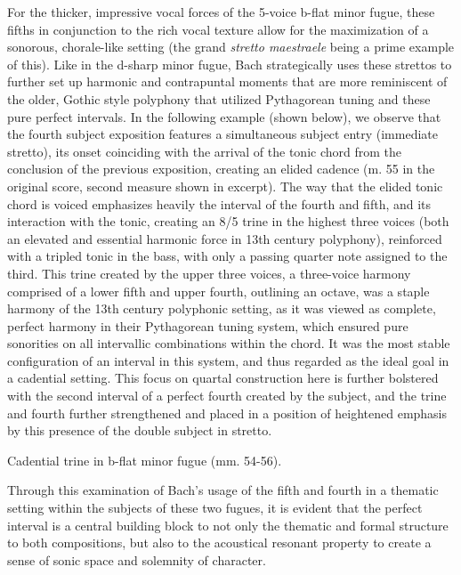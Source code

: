     For the thicker, impressive vocal forces of the 5-voice b-flat minor
fugue, these fifths in conjunction to the rich vocal texture allow for
the maximization of a sonorous, chorale-like setting (the grand
\emph{stretto maestraele} being a prime example of this). Like in the
d-sharp minor fugue, Bach strategically uses these strettos to further
set up harmonic and contrapuntal moments that are more reminiscent of
the older, Gothic style polyphony that utilized Pythagorean tuning and
these pure perfect intervals. In the following example (shown below), we
observe that the fourth subject exposition features a simultaneous
subject entry (immediate stretto), its onset coinciding with the arrival
of the tonic chord from the conclusion of the previous exposition,
creating an elided cadence (m. 55 in the original score, second measure
shown in excerpt). The way that the elided tonic chord is voiced
emphasizes heavily the interval of the fourth and fifth, and its
interaction with the tonic, creating an 8/5 trine in the highest three
voices (both an elevated and essential harmonic force in 13th century
polyphony), reinforced with a tripled tonic in the bass, with only a
passing quarter note assigned to the third. This trine created by the
upper three voices, a three-voice harmony comprised of a lower fifth and
upper fourth, outlining an octave, was a staple harmony of the 13th
century polyphonic setting, as it was viewed as complete, perfect
harmony in their Pythagorean tuning system, which ensured pure
sonorities on all intervallic combinations within the chord. It was the
most stable configuration of an interval in this system, and thus
regarded as the ideal goal in a cadential setting. This focus on quartal
construction here is further bolstered with the second interval of a
perfect fourth created by the subject, and the trine and fourth further
strengthened and placed in a position of heightened emphasis by this
presence of the double subject in stretto.



\begin{Example}[H]
    \begin{center}
    \caption{ Cadential trine in b-flat minor fugue (mm. 54-56). }
    \end{center}
\end{Example}
    
    Through this examination of Bach's usage of the fifth and fourth in a
thematic setting within the subjects of these two fugues, it is evident
that the perfect interval is a central building block to not only the
thematic and formal structure to both compositions, but also to the
acoustical resonant property to create a sense of sonic space and
solemnity of character.

